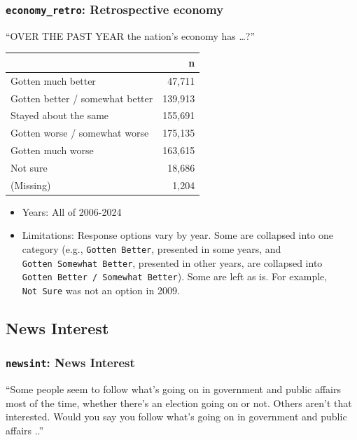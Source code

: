 \documentclass[10pt,article,oneside]{memoir}
\begin{document}
\subsubsection{\texorpdfstring{\texttt{economy\_retro}: Retrospective
economy}{economy\_retro: Retrospective economy}}\label{economy_retro-retrospective-economy}

``OVER THE PAST YEAR the nation's economy has \ldots?''

\begin{table}[H]
\centering
\begin{tabular}[t]{lr}
\toprule
 & n\\
\midrule
Gotten much better & 47,711\\
Gotten better / somewhat better & 139,913\\
Stayed about the same & 155,691\\
Gotten worse / somewhat worse & 175,135\\
Gotten much worse & 163,615\\
Not sure & 18,686\\
(Missing) & 1,204\\
\bottomrule
\end{tabular}
\end{table}

\begin{itemize}
\tightlist
\item
  Years: All of 2006-2024
\item
  Limitations: Response options vary by year. Some are collapsed into
  one category (e.g., \texttt{Gotten\ Better}, presented in some years,
  and \texttt{Gotten\ Somewhat\ Better}, presented in other years, are
  collapsed into \texttt{Gotten\ Better\ /\ Somewhat\ Better}). Some are
  left as is. For example, \texttt{Not\ Sure} was not an option in 2009.
\end{itemize}

\subsection{News Interest}\label{news-interest}

\subsubsection{\texorpdfstring{\texttt{newsint}: News
Interest}{newsint: News Interest}}\label{newsint-news-interest}

``Some people seem to follow what's going on in government and public
affairs most of the time, whether there's an election going on or not.
Others aren't that interested. Would you say you follow what's going on
in government and public affairs ..''
\end{document}
